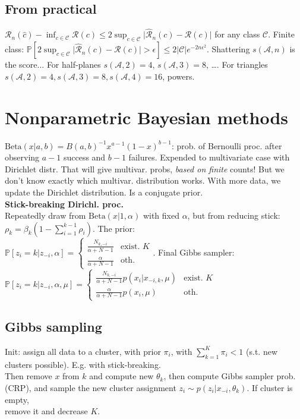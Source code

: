 \subsection*{From practical}
$\mathcal{R}_n(\hat{c})-\inf_{c\in\mathcal{C}}\mathcal{R}(c) \leq 2\sup_{c\in\mathcal{C}}\lvert \hat{\mathcal{R}}_n(c) - \mathcal{R}(c) \rvert$ for any class $\mathcal{C}$. Finite class:
$\mathbb{P}[2\sup_{c\in\mathcal{C}}\lvert \hat{\mathcal{R}}_n(c) - \mathcal{R}(c) \rvert>\epsilon]\leq 2\lvert\mathcal{C}\rvert e^{-2n\epsilon^2}$.
Shattering $s(\mathcal{A},n)$ is the score... For half-planes $s(\mathcal{A},2)=4$, $s(\mathcal{A},3)=8$, \dots. For triangles $s(\mathcal{A},2)=4,s(\mathcal{A},3)=8,s(\mathcal{A},4)=16$, powers.

\section*{Nonparametric Bayesian methods}
$\text{Beta}(x|a,b)=B(a,b)^{-1} x^{a-1}(1-x)^{b-1}$: prob. of Bernoulli proc. after observing $a-1$ success and $b-1$ failures. Expended to multivariate case with Dirichlet distr. That will give multivar. probs, \textit{based on finite} counts! But we don't know exactly which multivar. distribution works. With more data, we update the Dirichlet distribution. Is a conjugate prior.\\
\textbf{Stick-breaking Dirichl. proc.} \\ Repeatedly draw from $\text{Beta}(x|1,\alpha)$ with fixed $\alpha$, but from reducing stick: $\rho_k=\beta_k(1-\sum_{i=1}^{k-1}\rho_i)$. The prior:\\
$\mathbb{P}[z_i=k|z_{-i},\alpha]=\begin{cases}\frac{N_{k,-i}}{\alpha+N-1} & \text{exist. }K \\ \frac{\alpha}{\alpha+N-1} & \text{oth.}\end{cases}$. Final Gibbs sampler:\\
$\mathbb{P}[z_i=k|z_{-i},\alpha,\mu]=\begin{cases}\frac{N_{k,-i}}{\alpha+N-1}p(x_i|x_{-i,k},\mu) & \text{exist. }K \\ \frac{\alpha}{\alpha+N-1}p(x_i,\mu) & \text{oth.}\end{cases}$

\subsection*{Gibbs sampling}
Init: assign all data to a cluster, with prior $\pi_i$, with $\sum_{k=1}^K\pi_i<1$ (s.t. new clusters possible). E.g. with stick-breaking. \\
Then remove $x$ from $k$ and compute new $\theta_k$, then compute Gibbs sampler prob. (CRP), and sample the new cluster assignment $z_i\sim p(z_i|x_{-i},\theta_k)$. If cluster is empty, \\
remove it and decrease $K$.